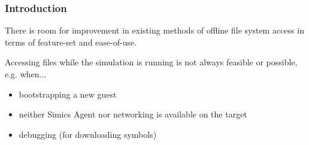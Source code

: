 


\begin{frame}

    \frametitle{Introduction}
    
    There is room for improvement in existing methods of offline file system access in terms of feature-set and ease-of-use.

    Accessing files while the simulation is running is not always feasible or possible, e.g. when...
    \begin{itemize}
        \item bootstrapping a new guest
        \item neither Simics Agent nor networking is available on the target
        \item debugging (for downloading symbols)
    \end{itemize}



\end{frame}